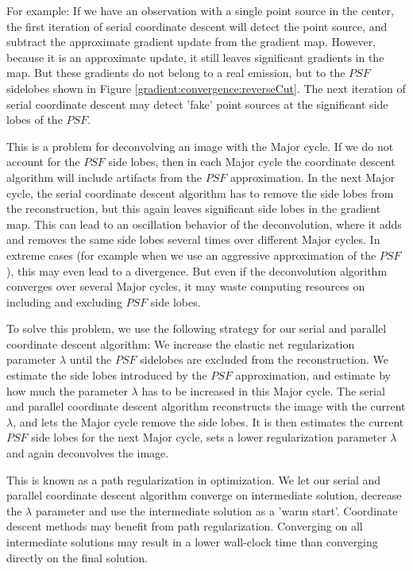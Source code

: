 For example: If we have an observation with a single point source in the center, the first iteration of serial coordinate descent will detect the point source, and subtract the approximate gradient update from the gradient map. However, because it is an approximate update, it still leaves significant gradients in the map. But these gradients do not belong to a real emission, but to the $PSF$ sidelobes shown in Figure \ref{gradient:convergence:reverseCut}. The next iteration of serial coordinate descent may detect 'fake' point sources at the significant side lobes of the $PSF$. 

This is a problem for deconvolving an image with the Major cycle. If we do not account for the $PSF$ side lobes, then in each Major cycle the coordinate descent algorithm will include artifacts from the $PSF$ approximation. In the next Major cycle, the serial coordinate descent algorithm has to remove the side lobes from the reconstruction, but this again leaves significant side lobes in the gradient map. This can lead to an oscillation behavior of the deconvolution, where it adds and removes the same side lobes several times over different Major cycles. In extreme cases (for example when we use an aggressive approximation of the $PSF$), this may even lead to a divergence. But even if the deconvolution algorithm converges over several Major cycles, it may waste computing resources on including and excluding $PSF$ side lobes.

To solve this problem, we use the following strategy for our serial and parallel coordinate descent algorithm: We increase the elastic net regularization parameter $\lambda$ until the $PSF$ sidelobes are excluded from the reconstruction. We estimate the side lobes introduced by the $PSF$ approximation, and estimate by how much the parameter $\lambda$ has to be increased in this Major cycle. The serial and parallel coordinate descent algorithm reconstructs the image with the current $\lambda$, and lets the Major cycle remove the side lobes. It is then estimates the current $PSF$ side lobes for the next Major cycle, sets a lower regularization parameter $\lambda$ and again deconvolves the image.

This is known as a path regularization in optimization. We let our serial and parallel coordinate descent algorithm converge on intermediate solution, decrease the $\lambda$ parameter and use the intermediate solution as a 'warm start'. Coordinate descent methods may benefit from path regularization\cite{friedman2010regularization}. Converging on all intermediate solutions may result in a lower wall-clock time than converging directly on the final solution.

